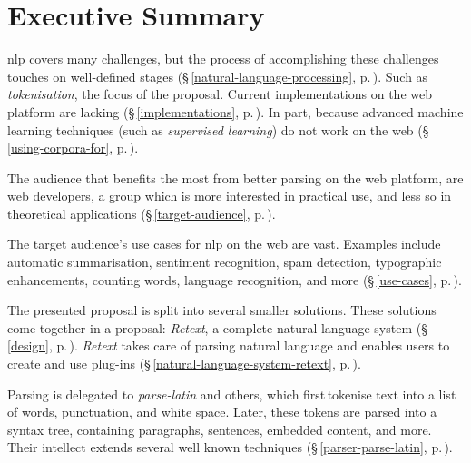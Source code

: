 
\begingroup
\let\clearpage\relax
\let\cleardoublepage\relax
\let\cleardoublepage\relax

\chapter*{Executive Summary}

\gls{nlp} covers many challenges, but the process of accomplishing
  these challenges touches on well-defined stages
  (§\,\ref{natural-language-processing},
  p.\,\pageref{natural-language-processing}).
Such as \emph{tokenisation}, the focus of the proposal.
Current implementations on the web platform are lacking
  (§\,\ref{implementations}, p.\,\pageref{implementations}).
In part, because advanced machine learning techniques (such as
  \emph{supervised learning}) do not work on the web
  (§\,\ref{using-corpora-for}, p.\,\pageref{using-corpora-for}).

The audience that benefits the most from better parsing on the web platform,
  are web developers, a group which is more interested in practical use, and
  less so in theoretical applications
  (§\,\ref{target-audience}, p.\,\pageref{target-audience}).

The target audience's use cases for \gls{nlp} on the web are vast. Examples
  include automatic summarisation, sentiment recognition, spam detection,
  typographic enhancements, counting words, language recognition, and more
  (§\,\ref{use-cases}, p.\,\pageref{use-cases}).

The presented proposal is split into several smaller solutions.
These solutions come together in a proposal: \emph{Retext}, a complete
  natural language system (§\,\ref{design}, p.\,\pageref{design}).
\emph{Retext} takes care of parsing natural language and enables users to
  create and use plug-ins (§\,\ref{natural-language-system-retext},
  p.\,\pageref{natural-language-system-retext}).

Parsing is delegated to \emph{parse-latin} and others, which first\,tokenise
  text into a list of words, punctuation, and white space. Later, these
  tokens are parsed into a syntax tree, containing paragraphs, sentences,
  embedded content, and more. Their intellect extends several well known
  techniques (§\,\ref{parser-parse-latin}, p.\,\pageref{parser-parse-latin}).

